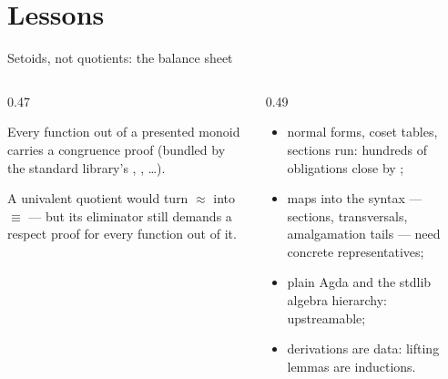 \section{Lessons}

\begin{frame}{Setoids, not quotients: the balance sheet}
\begin{columns}[T]
\begin{column}{0.47\textwidth}
\begin{tcolorbox}[colback=tinthot,colframe=hot,boxrule=0.6pt,arc=2pt,
  title=What it cost,fonttitle=\bfseries\small]
\small Every function out of a presented monoid carries a congruence proof
(bundled by the standard library's , , \ldots).
\end{tcolorbox}
\vspace{4pt}
\small A univalent quotient would turn $\approx$ into $\equiv$ --- but its eliminator
still demands a respect proof for every function out of it.
\end{column}
\begin{column}{0.49\textwidth}
\begin{win}[title=What it bought]
\small
\begin{itemize}
  \item normal forms, coset tables, sections \alert{run}: hundreds of obligations
        close by ;
  \item \alert{maps into the syntax} --- sections, transversals, amalgamation
        tails --- need concrete representatives;
  \item plain Agda and the stdlib algebra hierarchy: \alert{upstreamable};
  \item derivations are data: lifting lemmas are inductions.
\end{itemize}
\end{win}
\end{column}
\end{columns}
\end{frame}

